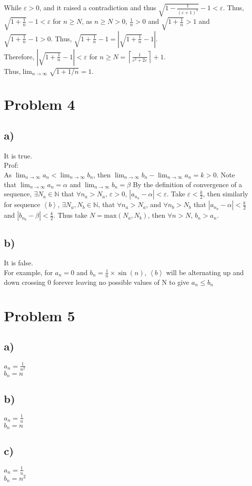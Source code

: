 \documentclass{article}
\begin{document}
While \(\varepsilon>0\), and it raised a contradiction and thus \(\sqrt{1-\frac{1}{(\varepsilon+1)^2}}-1 < \varepsilon\).
Thus, \(\sqrt{1+\frac{1}{n}}-1<\varepsilon\) for \(n\geqslant N\), as \(n\geqslant N>0\), \(\frac{1}{n}>0\) and \(\sqrt{1+\frac{1}{n}}>1\) and \(\sqrt{1+\frac{1}{n}}-1>0\).
Thus, \(\sqrt{1+\frac{1}{n}}-1 = \left|\sqrt{1+\frac{1}{n}}-1\right|\).\\
Therefore, \(\left|\sqrt{1+\frac{1}{n}}-1\right|<\varepsilon\) for \(n\geqslant N = \left\lceil \frac{1}{\varepsilon^2+2\varepsilon}\right\rceil+1\). \\
Thus,\(\lim_{n\rightarrow\infty}\sqrt{1+1/n}=1\).\\ 
\section*{Problem 4}
\subsection*{a)}
It is true.\\
Prof:\\
As \(\displaystyle \lim_{n\rightarrow\infty}a_n<\lim_{n\rightarrow\infty}b_n\), then \(\displaystyle \lim_{n\rightarrow\infty}b_n-\lim_{n\rightarrow\infty}a_n=k>0\).
Note that \(\displaystyle\lim_{n\rightarrow\infty}a_n=\alpha\) and \(\displaystyle\lim_{n\rightarrow\infty}b_n=\beta\)
By the definition of convergence of a sequence, \(\exists N_a\in \mathbb{N}\) that \(\forall n_a>N_a\), \(\varepsilon>0\), \(\left|a_{n_a}-\alpha\right|<\varepsilon\).
Take \(\varepsilon<\frac{k}{2}\), then similarly for sequence \(\left<b\right>\), \(\exists N_a,N_b\in\mathbb{N}\), that \(\forall n_a>N_a\), and \(\forall n_b>N_b\)
that \(\left|a_{n_a}-\alpha\right|<\frac{k}{2}\) and \(\left|b_{n_b}-\beta\right|<\frac{k}{2}\). Thus take \(N=\text{max}(N_a,N_b)\), then \(\forall n>N\),
\(b_n>a_n\).
\subsection*{b)}
It is false.\\
For example, for \(a_n=0\) and \(b_n = \frac{1}{n}\times \sin(n)\), \(\left<b\right>\) will be alternating up and down crossing 0 forever leaving no possible
values of N to give \(a_n\leqslant b_n\)
\section*{Problem 5}
\subsection*{a)}
\(a_n=\frac{1}{n^2}\)\\
\(b_n = n\)
\subsection*{b)}
\(a_n=\frac{1}{n}\)\\
\(b_n = n\)
\subsection*{c)}
\(a_n=\frac{1}{n}\)\\
\(b_n = n^2\)
\end{document}
